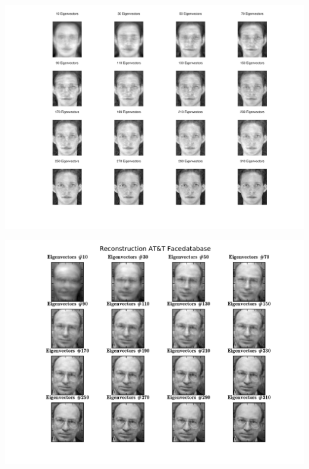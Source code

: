 \ifx\python\undefined
	\begin{center}
		\includegraphics[scale=0.6]{img/eigenfaces/octave_pca_reconstruction}
	\end{center}
\else
	\begin{center}
		\includegraphics[scale=0.6]{img/eigenfaces/python_pca_reconstruction}
	\end{center}
\fi

